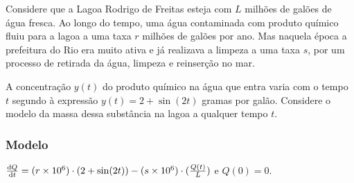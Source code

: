 \documentclass[12pt]{article}
\begin{document}
Considere que a Lagoa Rodrigo de Freitas esteja com $L$ milhões de galões de
água fresca. Ao longo do tempo, uma água contaminada com produto químico fluiu
para a lagoa a uma taxa $r$ milhões de galões por ano. Mas naquela época a
prefeitura do Rio era muito ativa e já realizava a limpeza a uma taxa $s$, por
um processo de retirada da água, limpeza e reinserção no mar. 

A concentração $y(t)$ do produto químico na água que entra varia com o tempo $t$ segundo
à expressão $y(t) = 2 + \sin (2t)$ gramas por galão. Considere o modelo da
massa dessa substância na lagoa a qualquer tempo $t$. 


\subsubsection{Modelo}

$\dv{Q}{t} = (r\times 10^6)\cdot (2 + \sin (2t)) - (s\times 10^6)\cdot
(\frac{Q(t)}{L})$ e $Q(0) = 0$. 
\end{document}
